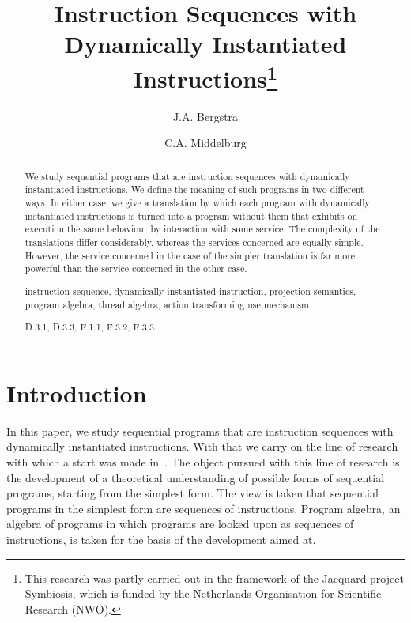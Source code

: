 \documentclass[fleqn]{llncs}
\title{Instruction Sequences with \\
       Dynamically Instantiated Instructions\thanks{This research was partly carried out in the framework of
               the  Jacquard-project Symbiosis, which is funded by the
               Netherlands Organisation for Scientific Research (NWO).}}
\author{J.A. Bergstra \and C.A. Middelburg}
\institute{Informatics Institute, University of Amsterdam, \\
           Science Park~107, 1098~XG~Amsterdam, the Netherlands \\
           \email{J.A.Bergstra@uva.nl,C.A.Middelburg@uva.nl}}
\begin{document}
\maketitle

\begin{abstract}
We study sequential programs that are instruction sequences with
dynamically instantiated instructions.
We define the meaning of such programs in two different ways.
In either case, we give a translation by which each program with
dynamically instantiated instructions is turned into a program without
them that exhibits on execution the same behaviour by interaction with
some service.
The complexity of the translations differ considerably, whereas the
services concerned are equally simple.
However, the service concerned in the case of the simpler translation is
far more powerful than the service concerned in the other case.
\begin{keywords}
instruction sequence, dynamically instantiated instruction,
projection semantics, program algebra, thread algebra,
action transforming use mechanism
\end{keywords}
\begin{classcode}
D.3.1, D.3.3, F.1.1, F.3.2, F.3.3.
\end{classcode}
\end{abstract}

\section{Introduction}
\label{sect-intro}

In this paper, we study sequential programs that are instruction
sequences with dynamically instantiated instructions.
With that we carry on the line of research with which a start was made
in~\cite{BL02a}.
The object pursued with this line of research is the development of a
theoretical understanding of possible forms of sequential programs,
starting from the simplest form.
The view is taken that sequential programs in the simplest form are
sequences of instructions.
Program algebra, an algebra of programs in which programs are looked
upon as sequences of instructions, is taken for the basis of the
development aimed at.
\end{document}
